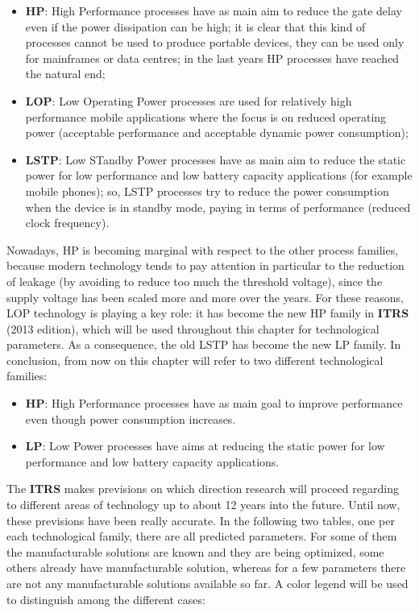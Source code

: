 \documentclass[a4paper, 12pt, twoside, openright]{report}
\begin{document}
	\begin{itemize}
	\item \textbf{HP}: High Performance processes have as main aim to reduce the gate delay even if the power dissipation can be high; it is clear that this kind of processes cannot be used to produce portable devices, they can be used only for mainframes or data centres; in the last years HP processes have reached the natural end;
	\item \textbf{LOP}: Low Operating Power processes are used for relatively high performance mobile applications where the focus is on reduced operating power (acceptable performance and acceptable dynamic power consumption);
	\item \textbf{LSTP}: Low STandby Power processes have as main aim to reduce the static power for low performance and low battery capacity applications (for example mobile phones); so, LSTP processes try to reduce the power consumption when the device is in standby mode, paying in terms of performance (reduced clock frequency).
	\end{itemize}

Nowadays, HP is becoming marginal with respect to the other process families, because modern technology tends to pay attention in particular to the reduction of leakage (by avoiding to reduce too much the threshold voltage), since the supply voltage has been scaled more and more over the years. For these reasons, LOP technology is playing a key role: it has become the new HP family in \textbf{ITRS} (2013 edition), which will be used throughout this chapter for technological parameters. As a consequence, the old LSTP has become the new LP family. In conclusion, from now on this chapter will refer to two different technological families:

\begin{itemize}
\item \textbf{HP}: High Performance processes have as main goal to improve performance even though power consumption increases.
\item \textbf{LP}: Low Power processes have aims at reducing the static power for low performance and low battery capacity applications.
\end{itemize}

The \textbf{ITRS} makes previsions on which direction research will proceed regarding to different areas of technology up to about 12 years into the future. Until now, these previsions have been really accurate. In the following two tables, one per each technological family, there are all predicted parameters. For some of them the manufacturable solutions are known and they are being optimized, some others already have manufacturable solution, whereas for a few parameters there are not any manufacturable solutions available so far. A color legend will be used to distinguish among the different cases:
\end{document}
